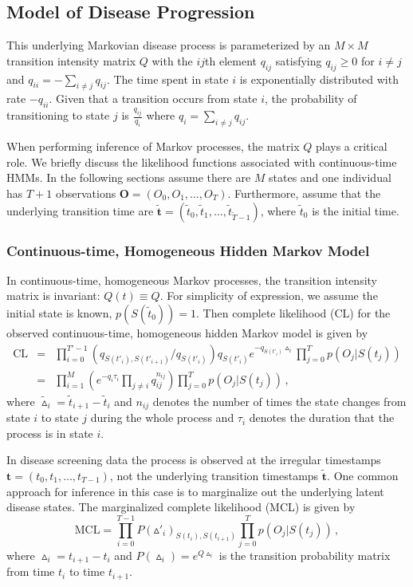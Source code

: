 \documentclass{article}
\begin{document}
\subsection{Model of Disease Progression}

This underlying Markovian  disease process is parameterized by an $M \times M$ transition intensity matrix $Q$ with the $ij$th element $q_{ij}$ satisfying $q_{ij} \geq 0$ for $i\neq j$ and $q_{ii} = -\sum_{i\neq j}q_{ij}$.    
The time spent in state $i$ is exponentially distributed with rate $-q_{ii}$.  Given that a transition occurs from state $i$,  the probability of transitioning to state $j$ is $\frac{q_{ij}}{q_i}$ where $q_i = \sum_{i\neq j}q_{ij}$.

When performing inference of Markov processes, the matrix $Q$ plays a critical role. We briefly discuss the likelihood functions associated with continuous-time HMMs. In the following sections assume there are $M$ states and one individual has $T+1$ observations $\bm O = (O_0, O_1, \ldots, O_T)$. Furthermore, assume that the underlying transition time are $\tilde{\bm t} = (\tilde{t}_0, \tilde{t}_1, \ldots, \tilde{t}_{\tilde{T}-1})$, where $\tilde{t}_0$ is the initial time.

\subsubsection{Continuous-time, Homogeneous Hidden Markov Model}
In continuous-time, homogeneous Markov processes, the transition intensity matrix is invariant: $Q(t) \equiv Q$. For simplicity of expression, we assume the initial state is known, $p(S(\tilde{t}_0)) = 1$. Then complete likelihood (CL) for the observed continuous-time, homogeneous hidden Markov model is given by 
\begin{eqnarray}
\mathrm{CL} & = & \prod_{i = 0}^{T'-1}(q_{S(t'_i),S(t'_{i+1})}/q_{S(t'_i)})q_{S(t'_i)}e^{-q_{S(t'_i)}\vartriangle_i} \prod_{j = 0}^Tp(O_j|S(t_j)) \nonumber\\
& = & \prod_{i = 1}^{M}\left(e^{-q_i\tau_i} \prod_{j\neq i} q_{ij}^{n_{ij}}\right)\prod_{j=0}^Tp(O_j|S(t_j))\,,
\label{CL}
\end{eqnarray}
where $\tilde{\vartriangle}_i = \tilde{t}_{i+1} - \tilde{t}_i$ and $n_{ij}$ denotes the number of times the state changes from state $i$ to state $j$ during the whole process and $\tau_i$ denotes the duration that the process is in state $i$.

In disease screening data the process is observed at the irregular timestamps $\bm t = (t_0, t_1, \ldots, t_{T-1})$, not  the underlying transition timestamps $\tilde{\bm t}$. One common approach for inference in this case is to marginalize out the underlying latent disease states. The marginalized complete likelihood (MCL) is given by
\begin{equation*}
\mathrm{MCL} = \prod_{i = 0}^{T-1}P(\vartriangle'_i)_{S(t_i), S(t_{i+1})}\prod_{j = 0}^T p(O_j|S(t_j)) \,,
\end{equation*}
where $\vartriangle_i = t_{i+1} - t_i$ and $P(\vartriangle_i) = e^{Q \vartriangle_i }$ is the transition probability matrix from time $t_i$ to time $t_{i+1}$.  
\end{document}
